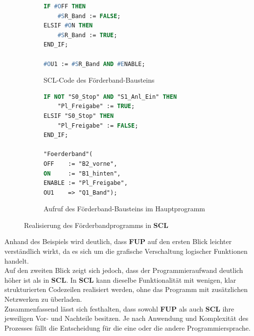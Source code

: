 \begin{figure}[H]
	\centering
	\begin{subfigure}[t]{0.4\textwidth}
		\centering
		\begin{lstlisting}[language=Pascal]
IF #OFF THEN
	#SR_Band := FALSE;	
ELSIF #ON THEN
	#SR_Band := TRUE;
END_IF;
			
#OU1 := #SR_Band AND #ENABLE;
		\end{lstlisting}
		\caption{SCL-Code des Förderband-Bausteins}
		\label{lst:Foerderband}
	\end{subfigure}
	\hfill
	\begin{subfigure}[t]{0.4\textwidth}
		\centering
		\begin{lstlisting}[language=Pascal]
IF NOT "S0_Stop" AND "S1_Anl_Ein" THEN
	"Pl_Freigabe" := TRUE;
ELSIF "S0_Stop" THEN
	"Pl_Freigabe" := FALSE;
END_IF;
			
"Foerderband"(
OFF    := "B2_vorne",
ON     := "B1_hinten",
ENABLE := "Pl_Freigabe",
OU1    => "Q1_Band");
		\end{lstlisting}
		\caption{Aufruf des Förderband-Bausteins im Hauptprogramm}
		\label{lst:Foerderband_call}
	\end{subfigure}
	\caption{Realisierung des Förderbandprogramms in \textbf{SCL}}
	\label{fig:Foerderband_Listing}
\end{figure}

Anhand des Beispiels wird deutlich, dass \textbf{FUP} auf den ersten Blick leichter verständlich wirkt, da es sich um die grafische Verschaltung logischer Funktionen handelt.\\
Auf den zweiten Blick zeigt sich jedoch, dass der Programmieraufwand deutlich höher ist als in \textbf{SCL}. In \textbf{SCL} kann dieselbe Funktionalität mit wenigen, klar strukturierten Codezeilen realisiert werden, ohne das Programm mit zusätzlichen Netzwerken zu überladen.\\
Zusammenfassend lässt sich festhalten, dass sowohl \textbf{FUP} als auch \textbf{SCL} ihre jeweiligen Vor- und Nachteile besitzen. Je nach Anwendung und Komplexität des Prozesses fällt die Entscheidung für die eine oder die andere Programmiersprache.
